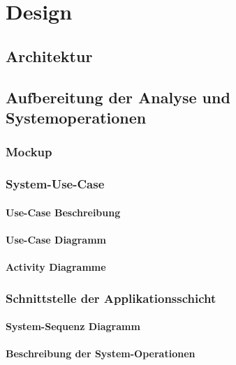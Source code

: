 \chapter{Design}\label{chap:Design}

\section{Architektur}

\section{Aufbereitung der Analyse und Systemoperationen}

\subsection{Mockup}

\subsection{System-Use-Case}

\subsubsection{Use-Case Beschreibung}

\subsubsection{Use-Case Diagramm}

\subsubsection{Activity Diagramme}

\subsection{Schnittstelle der Applikationsschicht}

\subsubsection{System-Sequenz Diagramm}

\subsubsection{Beschreibung der System-Operationen}

